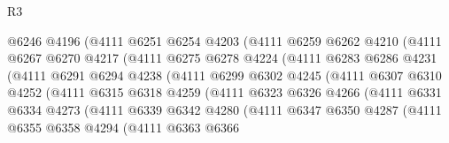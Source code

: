 \begin{lexlean}{R3}
\begin{coremodule}
                      @6246
                      @4196
                      (@4111
                        @6251
                        @6254
                        @4203
                        (@4111
                          @6259
                          @6262
                          @4210
                          (@4111
                            @6267
                            @6270
                            @4217
                            (@4111
                              @6275
                              @6278
                              @4224
                              (@4111
                                @6283
                                @6286
                                @4231
                                (@4111
                                  @6291
                                  @6294
                                  @4238
                                  (@4111
                                    @6299
                                    @6302
                                    @4245
                                    (@4111
                                      @6307
                                      @6310
                                      @4252
                                      (@4111
                                        @6315
                                        @6318
                                        @4259
                                        (@4111
                                          @6323
                                          @6326
                                          @4266
                                          (@4111
                                            @6331
                                            @6334
                                            @4273
                                            (@4111
                                              @6339
                                              @6342
                                              @4280
                                              (@4111
                                                @6347
                                                @6350
                                                @4287
                                                (@4111
                                                  @6355
                                                  @6358
                                                  @4294
                                                  (@4111
                                                    @6363
                                                    @6366

\end{coremodule}
\end{lexlean}
